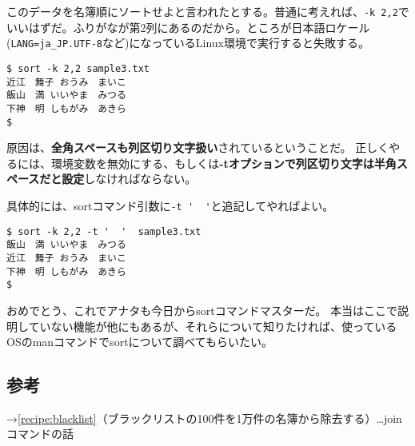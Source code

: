 このデータを名簿順にソートせよと言われたとする。普通に考えれば、\verb|-k 2,2|でいいはずだ。ふりがなが第2列にあるのだから。ところが日本語ロケール(\verb|LANG=ja_JP.UTF-8|など)になっているLinux環境で実行すると失敗する。

\begin{screen}
	\verb!$ sort -k 2,2 sample3.txt! \return \\
	\verb!近江　舞子 おうみ　まいこ! \\
	\verb!飯山　満 いいやま　みつる! \\
	\verb!下神　明 しもがみ　あきら! \\
	\verb!$ !
\end{screen}

原因は、\textbf{全角スペースも列区切り文字扱い}されているということだ。
正しくやるには、環境変数を無効にする、もしくは\textbf{-tオプションで列区切り文字は半角スペースだと設定}しなければならない。

具体的には、sortコマンド引数に\verb|-t '  '|と追記してやればよい。

\begin{screen}
	\verb!$ sort -k 2,2 -t '  '  sample3.txt! \return \\
	\verb!飯山　満 いいやま　みつる! \\
	\verb!近江　舞子 おうみ　まいこ! \\
	\verb!下神　明 しもがみ　あきら! \\
	\verb!$ !
\end{screen}

おめでとう、これでアナタも今日からsortコマンドマスターだ。
本当はここで説明していない機能が他にもあるが、それらについて知りたければ、使っているOSのmanコマンドでsortについて調べてもらいたい。

\subsection*{参考}

\noindent
→\ref{recipe:blacklist}（ブラックリストの100件を1万件の名簿から除去する）…joinコマンドの話